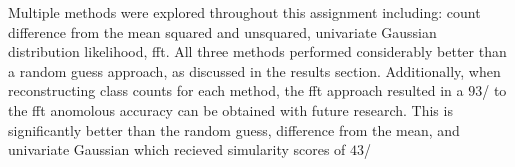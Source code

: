 Multiple methods were explored throughout this assignment including: count difference from the mean squared and unsquared,
univariate Gaussian distribution likelihood, fft. All three methods performed considerably better than a random guess approach,
as discussed in the results section. Additionally, when reconstructing class counts for each method, the fft approach resulted in
a $93$/%
to the fft anomolous accuracy can be obtained with future research. This is significantly better than the random guess,
difference from the mean, and univariate Gaussian which recieved simularity scores of $43$/%
